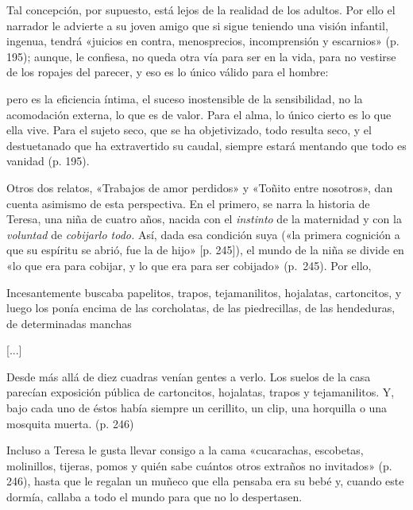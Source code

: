 \documentclass[14pt,twoside,final]{extbook} %
\begin{document}
Tal concepción, por supuesto, está lejos de la realidad de los adultos. Por ello el narrador le advierte a su joven amigo que si sigue teniendo una visión infantil, ingenua, tendrá «juicios en contra, menosprecios, incomprensión y escarnios» (p. 195); aunque, le confiesa, no queda otra vía para ser en la vida, para no vestirse de los ropajes del parecer, y eso es lo único válido para el
hombre:
\begin{quoting}
pero es la eficiencia íntima, el suceso inostensible de la sensibilidad, no la acomodación externa, lo que es de valor. Para el alma, lo único cierto es lo que ella vive. Para el sujeto seco, que se ha objetivizado, todo resulta seco, y el destuetanado que ha extravertido su caudal, siempre estará mentando que todo es vanidad (p. 195).
\end{quoting}
Otros dos relatos, «Trabajos de amor perdidos» y «Toñito entre nosotros», dan cuenta asimismo de esta perspectiva. En el primero, se narra la historia de Teresa, una niña de cuatro años, nacida con el \emph{instinto} de la maternidad y con la \emph{voluntad} de \emph{cobijarlo todo.} Así, dada esa condición suya («la primera cognición a que su espíritu se abrió, fue la de hijo» [p. 245]), el mundo de la niña se divide en «lo que era para cobijar, y lo que era para ser cobijado» (p.~245). Por ello,
\begin{quoting}
Incesantemente buscaba papelitos, trapos, tejamanilitos, hojalatas, cartoncitos, y luego los ponía encima de las corcholatas, de las piedrecillas, de las hendeduras, de determinadas manchas

\centerline{[...]}

Desde más allá de diez cuadras venían gentes a verlo. Los suelos de la casa parecían exposición pública de cartoncitos, hojalatas, trapos y tejamanilitos. Y, bajo cada uno de éstos había siempre un cerillito, un clip, una horquilla o una mosquita muerta. (p. 246)
\end{quoting} 
Incluso a Teresa le gusta llevar consigo a la cama «cucarachas, escobetas, molinillos, tijeras, pomos y quién sabe cuántos otros extraños no invitados» (p. 246), hasta que le regalan un muñeco que ella pensaba era su bebé y, cuando este dormía, callaba a todo el mundo para que no lo despertasen.
\end{document}
